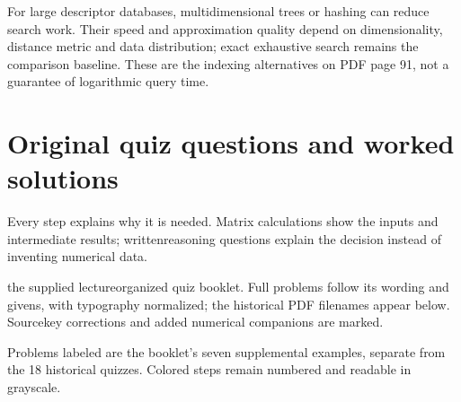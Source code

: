 \documentclass[letterpaper,11pt,english,openany,oneside]{jupyterBook}
\begin{document}
\sphinxAtStartPar
For large descriptor databases, multidimensional trees or hashing can reduce search work. Their speed and approximation quality depend on dimensionality, distance metric and data distribution; exact exhaustive search remains the comparison baseline. These are the indexing alternatives on PDF page 91, not a guarantee of logarithmic query time.

\ignorespaces
{}\ignorespaces
{}\ignorespaces
{}\ignorespaces
{}\ignorespaces
\sphinxstepscope


\section{Original quiz questions and worked solutions}
\label{\detokenize{lectures/lecture05/quiz-workbook:original-quiz-questions-and-worked-solutions}}\label{\detokenize{lectures/lecture05/quiz-workbook:lec05-quiz-workbook}}\label{\detokenize{lectures/lecture05/quiz-workbook::doc}}
\sphinxAtStartPar
{} Every step explains why it is needed. Matrix calculations show the inputs and intermediate results; written\sphinxhyphen{}reasoning questions explain the decision instead of inventing numerical data.

\sphinxAtStartPar
{} the supplied lecture\sphinxhyphen{}organized quiz booklet. Full problems follow its wording and givens, with typography normalized; the historical PDF filenames appear below. Source\sphinxhyphen{}key corrections and added numerical companions are marked.

\sphinxAtStartPar
{} Problems labeled  are the booklet’s seven supplemental examples, separate from the 18 historical quizzes. Colored steps remain numbered and readable in grayscale.
\end{document}
